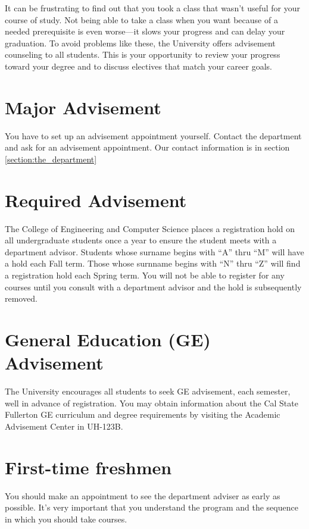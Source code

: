 \documentclass{book}
\begin{document}
It can be frustrating to find out that you took a class that wasn’t useful for your course of study. Not being able to take a class when you want because of a needed prerequisite is even worse---it slows your progress and can delay your graduation. To avoid problems like these, the University offers advisement counseling to all students. This is your opportunity to review your progress toward your degree and to discuss electives that match your career goals.

\section{Major Advisement}
You have to set up an advisement appointment yourself. Contact the department and ask for an advisement appointment. Our contact information is in section \ref{section:the_department}

\section{Required Advisement}
The College of Engineering and Computer Science places a registration hold on all undergraduate students once a year to ensure the student meets with a department advisor. Students whose surname begins with ``A'' thru ``M'' will have a hold each Fall term. Those whose surnname begins with ``N'' thru ``Z'' will find a registration hold each Spring term.  You will not be able to register for any courses until you consult with a department advisor and the hold is subsequently removed.

\section{General Education (GE) Advisement}
 
The University encourages all students to seek GE advisement, each semester, well in advance of registration.  You may obtain information about the Cal State Fullerton GE curriculum and degree requirements by visiting the Academic Advisement Center in UH-123B.

\section{First-time freshmen}
You should make an appointment to see the department adviser as early as possible. It’s very important that you understand the program and the sequence in which you should take courses.
\end{document}
